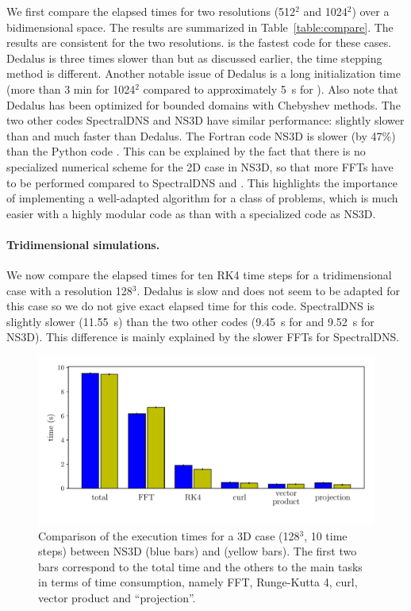 We first compare the elapsed times for two resolutions (512$^2$ and 1024$^2$) over
a bidimensional space.  The results are summarized in Table~\ref{table:compare}.
%
The results are consistent for the two resolutions.  is the
fastest code for these cases. Dedalus is three times slower than
 but as discussed earlier, the time stepping method is
different. Another notable issue of Dedalus is a long initialization time (more
than 3 min for 1024$^2$ compared to approximately 5~s for ).
Also note that Dedalus has been optimized for bounded domains with Chebyshev
methods.
%
The two other codes SpectralDNS and NS3D have similar performance: slightly slower
than  and much faster than Dedalus.
%
The Fortran code NS3D is slower (by 47\%) than the Python code .
This can be explained by the fact that there is no specialized numerical scheme
for the 2D case in NS3D, so that more FFTs have to be performed compared to
SpectralDNS and .
%
This highlights the importance of implementing a well-adapted algorithm for
a class of problems, which is much easier with a highly modular code as
 than with a specialized code as NS3D.


\paragraph{Tridimensional simulations.}

We now compare the elapsed times for ten RK4 time steps for a tridimensional case
with a resolution 128$^3$.
%
Dedalus is slow and does not seem to be adapted for this case so we do not give
exact elapsed time for this code.
%
SpectralDNS is slightly slower (11.55~s) than the two other codes (9.45~s for
 and 9.52~s for NS3D). This difference is mainly explained by the
slower FFTs for SpectralDNS.

\begin{figure}[htp]
\centering
\includegraphics[width=\linewidth]{./tmp/fig_compare_with_ns3d}
\caption{Comparison of the execution times for a 3D case (128$^3$, 10 time steps)
between NS3D (blue bars) and  (yellow bars).
%
The first two bars correspond to the total time and the others to the main tasks
in terms of time consumption, namely FFT, Runge-Kutta 4, curl, vector product and
``projection''. }
\label{fig:compare:with:ns3d}
\end{figure}

